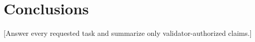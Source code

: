 \section{Conclusions}
[Answer every requested task and summarize only validator-authorized claims.]
